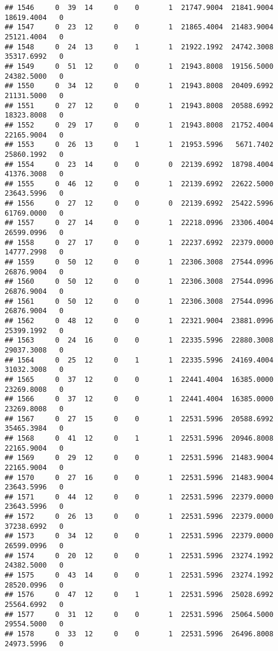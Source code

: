 \documentclass[
]{article}
\begin{document}
\begin{enumerate}
\begin{verbatim}
## 1546     0  39  14     0    0       1  21747.9004  21841.9004  18619.4004   0
## 1547     0  23  12     0    0       1  21865.4004  21483.9004  25121.4004   0
## 1548     0  24  13     0    1       1  21922.1992  24742.3008  35317.6992   0
## 1549     0  51  12     0    0       1  21943.8008  19156.5000  24382.5000   0
## 1550     0  34  12     0    0       1  21943.8008  20409.6992  21131.5000   0
## 1551     0  27  12     0    0       1  21943.8008  20588.6992  18323.8008   0
## 1552     0  29  17     0    0       1  21943.8008  21752.4004  22165.9004   0
## 1553     0  26  13     0    1       1  21953.5996   5671.7402  25860.1992   0
## 1554     0  23  14     0    0       0  22139.6992  18798.4004  41376.3008   0
## 1555     0  46  12     0    0       1  22139.6992  22622.5000  23643.5996   0
## 1556     0  27  12     0    0       0  22139.6992  25422.5996  61769.0000   0
## 1557     0  27  14     0    0       1  22218.0996  23306.4004  26599.0996   0
## 1558     0  27  17     0    0       1  22237.6992  22379.0000  14777.2998   0
## 1559     0  50  12     0    0       1  22306.3008  27544.0996  26876.9004   0
## 1560     0  50  12     0    0       1  22306.3008  27544.0996  26876.9004   0
## 1561     0  50  12     0    0       1  22306.3008  27544.0996  26876.9004   0
## 1562     0  48  12     0    0       1  22321.9004  23881.0996  25399.1992   0
## 1563     0  24  16     0    0       1  22335.5996  22880.3008  29037.3008   0
## 1564     0  25  12     0    1       1  22335.5996  24169.4004  31032.3008   0
## 1565     0  37  12     0    0       1  22441.4004  16385.0000  23269.8008   0
## 1566     0  37  12     0    0       1  22441.4004  16385.0000  23269.8008   0
## 1567     0  27  15     0    0       1  22531.5996  20588.6992  35465.3984   0
## 1568     0  41  12     0    1       1  22531.5996  20946.8008  22165.9004   0
## 1569     0  29  12     0    0       1  22531.5996  21483.9004  22165.9004   0
## 1570     0  27  16     0    0       1  22531.5996  21483.9004  23643.5996   0
## 1571     0  44  12     0    0       1  22531.5996  22379.0000  23643.5996   0
## 1572     0  26  13     0    0       1  22531.5996  22379.0000  37238.6992   0
## 1573     0  34  12     0    0       1  22531.5996  22379.0000  26599.0996   0
## 1574     0  20  12     0    0       1  22531.5996  23274.1992  24382.5000   0
## 1575     0  43  14     0    0       1  22531.5996  23274.1992  28520.0996   0
## 1576     0  47  12     0    1       1  22531.5996  25028.6992  25564.6992   0
## 1577     0  31  12     0    0       1  22531.5996  25064.5000  29554.5000   0
## 1578     0  33  12     0    0       1  22531.5996  26496.8008  24973.5996   0

\end{verbatim}
\end{enumerate}
\end{document}
